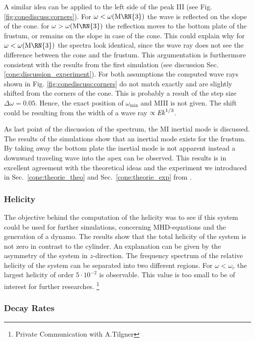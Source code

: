 A similar idea can be applied to the left side of the peak \RN{3} (see Fig. \ref{fig:conediscuss:corners}).
For $\omega<\omega(\text{M\RN{3}})$ the wave is reflected on the slope of the cone.
for  $\omega>\omega(\text{M\RN{3}})$ the reflection moves to the bottom plate of the frustum,
or remains on the slope in case of the cone.
This could explain why for   $\omega<\omega(\text{M\RN{3}})$  the spectra look identical,
since the wave ray does not see the difference between the cone and the frustum.
This argumentation is furthermore consistent with the results from the first simulation
(see discussion Sec. \ref{cone:discussion_experiment}).
For both assumptions the computed wave rays shown in Fig. \ref{fig:conediscuss:corners} do not match exactly and are slightly shifted from the corners of the cone.
This is probably a result of the step size $\Delta \omega = 0.05$. Hence, the exact position of $\omega_\text{min}$ and M\RN{3} is not given.
The shift could be resulting from the width of a wave ray $\propto \mbox{\textit{Ek}}^{1/3}$.

As last point of the discussion of the spectrum, the M\RN{1} inertial mode is discussed.
The results of the simulations show that an inertial mode exists for the frustum.
By taking away the bottom plate the inertial mode is not apparent instead
a downward traveling wave into the apex can be observed.
This results is in excellent agreement with the theoretical ideas and the experiment we introduced in
Sec.~\ref{cone:theorie_theo} and Sec.~\ref{cone:theorie_exp} from \citep{Greenspan1969, Beardsley1970}.

\subsubsection{Helicity}

The objective behind the computation of the helicity was to see if this system could be used
for further simulations, concerning MHD-equations and the generation of a dynamo.
The results show that the total helicity of the system is not zero in contrast to the cylinder.
An explanation can be given by the asymmetry of the system in $z$-direction.
The frequency spectrum of the relative helicity of the  system can be separated into two different regions.
For $\omega<\omega_c$ the largest helicity of order $5\cdot10^{-2}$ is observable.
This value is too small to be of interest for further researches.
\footnote{Private Communication with A.Tilgner}


\subsubsection{Decay Rates}

